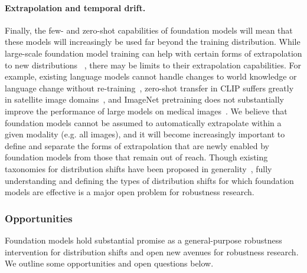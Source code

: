 \paragraph{Extrapolation and temporal drift.} 

Finally, the few- and zero-shot capabilities of foundation models will mean that these models will increasingly be used far beyond the training distribution. While large-scale foundation model training can help with certain forms of extrapolation to new distributions ~\citep{papadimitriou2020learning}, there may be limits to their extrapolation capabilities. For example, existing language models cannot handle changes to world knowledge or language change without re-training~\citep{lazaridou2021pitfalls,dhingra2021time}, zero-shot transfer in CLIP suffers greatly in satellite image domains~\citep{radford2021learning}, and ImageNet pretraining does not substantially improve the performance of large models on medical images~\citep{raghu2019transfusion,ke2021chextransfer}. We believe that foundation models cannot be assumed to automatically extrapolate within a given modality (e.g. all images), and it will become increasingly important to define and separate the forms of extrapolation that are newly enabled by foundation models from those that remain out of reach. Though existing taxonomies for distribution shifts have been proposed in generality~\citep{candela2009when,ye2021oodbench}, fully understanding and defining the types of distribution shifts for which foundation models are effective is a major open problem for robustness research.

\subsubsection{Opportunities}
\label{sec:robustness-opportunities}

Foundation models hold substantial promise as a general-purpose robustness intervention for distribution shifts and open new avenues for robustness research. We outline some opportunities and open questions below.

